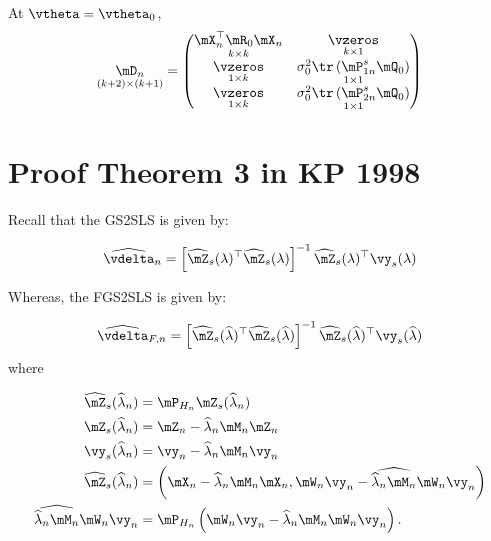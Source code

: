 \begin{subappendices}
At $\vtheta = \vtheta_0$,
\begin{equation*}
\underset{(k + 2)\times (k + 1)}{\mD_n} = 
\begin{pmatrix}
  \underset{k\times k}{\mX_n^\top\mR_0\mX_n} & \underset{k\times 1}{\vzeros} \\
  \underset{1 \times k}{\vzeros} & \underset{1\times 1}{\sigma_0^2 \tr\left(\mP_{1n}^{s}\mQ_0\right)}\\
  \underset{1\times k}{\vzeros} & \underset{1\times 1}{\sigma_0^2 \tr\left(\mP_{2n}^{s}\mQ_0\right)}
\end{pmatrix}
\end{equation*}


\section{Proof Theorem 3 in KP 1998}

Recall that the GS2SLS is given by:

\begin{equation}
  \widehat{\vdelta}_n = \left[\widehat{\mZ}_s(\lambda)^\top\widehat{\mZ}_s(\lambda)\right]^{-1}\widehat{\mZ}_s(\lambda)^\top\vy_s(\lambda)
\end{equation}

Whereas, the FGS2SLS is given by:

\begin{equation}
  \widehat{\vdelta}_{F, n} = \left[\widehat{\mZ}_s(\widehat{\lambda})^\top\widehat{\mZ}_s(\widehat{\lambda})\right]^{-1}\widehat{\mZ}_s(\widehat{\lambda})^\top\vy_s(\widehat{\lambda})
\end{equation}
%
where

\begin{equation}
  \begin{aligned}
    \widehat{\mZ}_s(\widehat{\lambda}_n) & = \mP_{H_n}\mZ_s(\widehat{\lambda}_n) \\
    \mZ_s(\widehat{\lambda}_n) & = \mZ_n - \widehat{\lambda}_n\mM_n\mZ_n \\
    \vy_s(\widehat{\lambda}_n) & = \vy_n - \widehat{\lambda}_n\mM_n\vy_n \\
    \widehat{\mZ}_s(\widehat{\lambda}_n) & = \left(\mX_n - \widehat{\lambda}_n\mM_n\mX_n, \mW_n\vy_n - \widehat{\widehat{\lambda}_n\mM_n}\mW_n\vy_n\right) \\
    \widehat{\widehat{\lambda}_n\mM_n}\mW_n\vy_n & = \mP_{H_n}\left(\mW_n\vy_n - \widehat{\lambda}_n\mM_n\mW_n\vy_n\right).
 \end{aligned}
\end{equation}


\end{subappendices}
